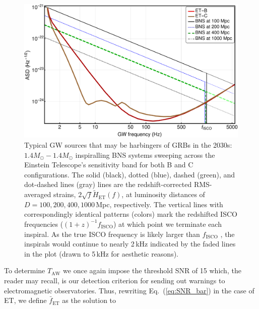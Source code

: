 \documentclass[prd,amsmath,amssymb,aps,floats,amsfonts,notitlepage,superscriptaddress,eqsecnum,nofootinbib,10pt]{revtex4-1}
\begin{document}
\begin{figure}[ht!]
\includegraphics[width=\linewidth]{../Figures/ET_strains_redshifted.pdf}
\caption{Typical GW sources that may be harbingers of GRBs in the 2030s: $1.4 M_\odot-1.4 M_\odot$ inspiralling BNS systems sweeping across 
the Einstein Telescope's sensitivity band for both B and C configurations.
The solid (black), dotted (blue), dashed (green), and dot-dashed lines (gray) lines are the redshift-corrected
RMS-averaged strains, $2\sqrt{f}\tilde{H}_\text{ET}(f)$, at luminosity distances of $D=100, 200, 400, 1000\,$Mpc, respectively. 
The vertical lines with correspondingly identical patterns (colors) mark the redshifted ISCO frequencies ($(1+z)^{-1} f_\text{ISCO}$) at which point we terminate each inspiral.
As the true ISCO frequency is likely larger than $f_\text{ISCO}$ \cite{Marronetti:2003hx}, the inspirals would continue to nearly 2\,kHz indicated by the 
faded lines in the plot (drawn to 5\,kHz for aesthetic reasons).
}
\label{fig:ETB2030}
\end{figure}
%
%
To determine $T_\text{AW}$ we once again impose the threshold SNR of 15 which, the reader may recall, 
is our detection criterion for sending out warnings to electromagnetic observatories. Thus, rewriting Eq.~(\ref{eq:SNR_bar}) in the case of ET, we define $\bar{f}_\text{ET}$ as the solution to
\end{document}
